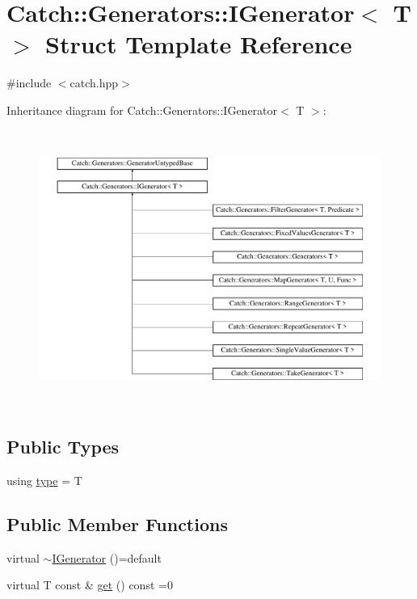 \hypertarget{struct_catch_1_1_generators_1_1_i_generator}{}\section{Catch\+::Generators\+::I\+Generator$<$ T $>$ Struct Template Reference}
\label{struct_catch_1_1_generators_1_1_i_generator}


{\ttfamily \#include $<$catch.\+hpp$>$}

Inheritance diagram for Catch\+::Generators\+::I\+Generator$<$ T $>$\+:\begin{figure}[H]
\begin{center}
\leavevmode
\includegraphics[height=9.090909cm]{struct_catch_1_1_generators_1_1_i_generator}
\end{center}
\end{figure}
\subsection*{Public Types}
\begin{DoxyCompactItemize}
\item 
using \mbox{\hyperlink{struct_catch_1_1_generators_1_1_i_generator_a1f8677875fe0ff31f39c60d45504b9a5}{type}} = T
\end{DoxyCompactItemize}
\subsection*{Public Member Functions}
\begin{DoxyCompactItemize}
\item 
virtual \mbox{\hyperlink{struct_catch_1_1_generators_1_1_i_generator_afe5b6eecbbd735e69748d68574611747}{$\sim$\+I\+Generator}} ()=default
\item 
virtual T const  \& \mbox{\hyperlink{struct_catch_1_1_generators_1_1_i_generator_a525d381fc9249a885b075a0632a8579a}{get}} () const =0
\end{DoxyCompactItemize}


